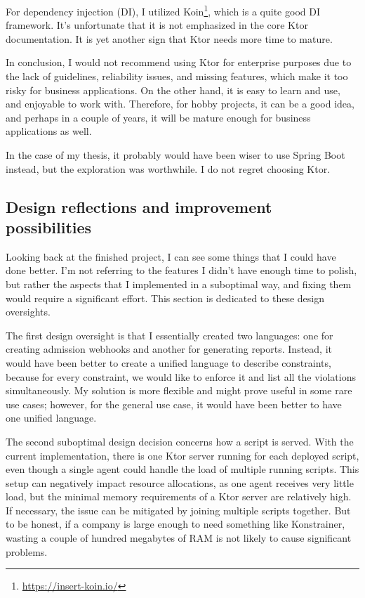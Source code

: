 For dependency injection (DI), I utilized Koin\footnote{\url{https://insert-koin.io/}}, which is a quite good DI framework. It's unfortunate that it is not emphasized in the core Ktor documentation. It is yet another sign that Ktor needs more time to mature.

In conclusion, I would not recommend using Ktor for enterprise purposes due to the lack of guidelines, reliability issues, and missing features, which make it too risky for business applications. On the other hand, it is easy to learn and use, and enjoyable to work with. Therefore, for hobby projects, it can be a good idea, and perhaps in a couple of years, it will be mature enough for business applications as well.

In the case of my thesis, it probably would have been wiser to use Spring Boot instead, but the exploration was worthwhile. I do not regret choosing Ktor.

\subsection[Design Reflections]{Design reflections and improvement possibilities}

Looking back at the finished project, I can see some things that I could have done better. I'm not referring to the features I didn't have enough time to polish, but rather the aspects that I implemented in a suboptimal way, and fixing them would require a significant effort. This section is dedicated to these design oversights.

The first design oversight is that I essentially created two languages: one for creating admission webhooks and another for generating reports. Instead, it would have been better to create a unified language to describe constraints, because for every constraint, we would like to enforce it and list all the violations simultaneously. My solution is more flexible and might prove useful in some rare use cases; however, for the general use case, it would have been better to have one unified language.

The second suboptimal design decision concerns how a script is served. With the current implementation, there is one Ktor server running for each deployed script, even though a single agent could handle the load of multiple running scripts. This setup can negatively impact resource allocations, as one agent receives very little load, but the minimal memory requirements of a Ktor server are relatively high. If necessary, the issue can be mitigated by joining multiple scripts together. But to be honest, if a company is large enough to need something like Konstrainer, wasting a couple of hundred megabytes of RAM is not likely to cause significant problems.

